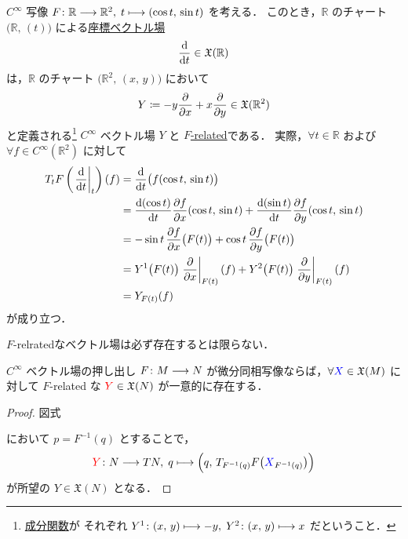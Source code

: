 \documentclass[TQFT_main]{subfiles}
\begin{document}
\begin{myexample}[]{}
    $C^\infty$ 写像 $F \colon \mathbb{R} \longrightarrow \mathbb{R}^2,\; t\longmapsto (\cos t,\, \sin t)$ を考える．
    このとき，$\mathbb{R}$ のチャート $\bigl(\mathbb{R},\, (t)\bigr)$ による\hyperref[def:coord-vecf]{座標ベクトル場}
    \begin{align}
        \dv{}{t} \in \mathfrak{X}(\mathbb{R})
    \end{align}
    は，$\mathbb{R}$ のチャート $\bigl(\mathbb{R}^2,\, (x,\, y)\bigr)$ において
    \begin{align}
        Y \coloneqq - y \pdv{}{x} + x \pdv{}{y} \in \mathfrak{X} (\mathbb{R}^2)
    \end{align}
    と定義される\footnote{\hyperref[def:vecf]{成分関数}が それぞれ $Y^1 \colon (x,\, y) \longmapsto -y,\; Y^2 \colon (x,\, y) \longmapsto x$ だということ．} $C^\infty$ ベクトル場 $Y$ と \hyperref[def:F-related]{$F$-related}である．
    実際，$\forall t \in \mathbb{R}$ および $\forall f \in C^\infty (\mathbb{R}^2)$ に対して
    \begin{align}
        T_t F\left(\eval{\dv{}{t}}_t\right) (f) &= \dv{}{t}() \bigl( f(\cos t,\, \sin t) \bigr) \\
        &= \dv{(\cos t)}{t} \pdv{f}{x}()(\cos t,\, \sin t) + \dv{(\sin t)}{t} \pdv{f}{y}()(\cos t,\, \sin t) \\
        &= - \sin t \, \pdv{f}{x}()\bigl(F(t)\bigr) + \cos t \, \pdv{f}{y} \bigl(F(t)\bigr) \\
        &= Y^1 \bigl( F(t) \bigr)  \eval{\pdv{}{x}}_{F(t)}(f) + Y^2 \bigl( F(t) \bigr)  \eval{\pdv{}{y}}_{F(t)} (f) \\
        &= Y_{F(t)} (f)
    \end{align}
    が成り立つ．
\end{myexample}

$F$-relratedなベクトル場は必ず存在するとは限らない．

\begin{myprop}[label=prop:diffeo-Frelated]{$C^\infty$ ベクトル場の押し出し}
    $F \colon M \longrightarrow N$ が微分同相写像ならば，$\forall \textcolor{blue}{X} \in \mathfrak{X}(M)$ に対して $F$-related な $\textcolor{red}{Y} \in \mathfrak{X}(N)$ が一意的に存在する．
\end{myprop}

\begin{proof}
    図式
    \begin{center}
    \end{center}
    において $p = F^{-1}(q)$ とすることで，
    \begin{align}
        \textcolor{red}{Y} \colon N \longrightarrow TN,\; q \longmapsto \Bigl( q,\, T_{F^{-1}(q)} F \bigl(\textcolor{blue}{X}_{F^{-1}(q)}\bigr)  \Bigr) 
    \end{align}
    が所望の $Y \in \mathfrak{X}(N)$ となる．
\end{proof}
\end{document}
